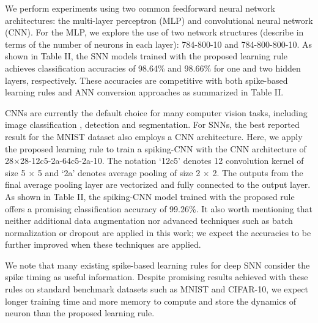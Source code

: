 \documentclass[conference]{IEEEtran}
\begin{document}
We perform experiments using two common feedforward neural network architectures: the multi-layer perceptron (MLP) and convolutional neural network (CNN). For the MLP, we explore the use of two network structures (describe in terms of the number of neurons in each layer): 784-800-10 and 784-800-800-10. As shown in Table II, the SNN models trained with the proposed learning rule achieves classification accuracies of 98.64\% and 98.66\% for one and two hidden layers, respectively. These accuracies are competitive with both spike-based learning rules \cite{o2016deep,lee2016training,neftci2017event,mostafa2018supervised,spatiotemporal} and ANN conversion approaches\cite{diehl2015fast,neil2016learning} as summarized in Table II. 

CNNs are currently the default choice for many computer vision tasks, including image classification \cite{krizhevsky2012imagenet}, detection\cite{vggnet} and segmentation\cite{redmon2016you}. For SNNs, the best reported result for the MNIST dataset also employs a CNN architecture\cite{ethImageNet}. Here, we apply the proposed learning rule to train a spiking-CNN with the CNN architecture of 28$\times$28-12c5-2a-64c5-2a-10. The notation `12c5' denotes 12 convolution kernel of size 5 $\times$ 5 and `2a' denotes average pooling of size 2 $\times$ 2. The outputs from the final average pooling layer are vectorized and fully connected to the output layer. As shown in Table II, the spiking-CNN model trained with the proposed rule offers a promising classification accuracy of 99.26\%. It also worth mentioning that neither additional data augmentation nor advanced techniques such as batch normalization or dropout are applied in this work; we expect the accuracies to be further improved when these techniques are applied. 

We note that many existing spike-based learning rules for deep SNN consider the spike timing as useful information. Despite promising results achieved with these rules on standard benchmark datasets such as MNIST and CIFAR-10, we expect longer training time and more memory to compute and store the dynamics of neuron than the proposed learning rule.
\end{document}

